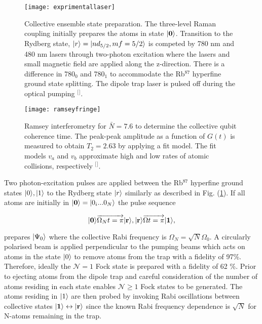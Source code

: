 \begin{figure}[t]
\centering
\texttt{[image: exprimentallaser]}
\caption{\label{fig:experimentallaser} Collective ensemble state preparation. The three-level Raman coupling initially prepares the atoms in state $\lvert\textbf{0}\rangle$. Transition to the Rydberg state, $\lvert r\rangle=\lvert nd_{5/2},mf=5/2\rangle$ is competed by 780 nm and 480 nm lasers through two-photon excitation where the lasers and small magnetic field are applied along the z-direction. There is a difference in 780$_{0}$ and 780$_{1}$ to accommodate the Rb$^{87}$ hyperfine ground state splitting. The dipole trap laser is pulsed off during the optical pumping $^{[}$\citep{Ebert2015CoherenceQubits}$^{]}$.}
\end{figure}

\begin{figure}[b]
\centering
\texttt{[image: ramseyfringe]}
\caption{\label{fig:ramseyfringe} Ramsey interferometry for $\bar{N}=7.6$ to determine the collective qubit coherence time. The peak-peak amplitude as a function of $G(t)$ is measured to obtain $T_{2}=2.63$ by applying a fit model. The fit models $v_{a}$ and $v_{b}$ approximate high and low rates of atomic collisions, respectively $^{[}$\citep{Ebert2015CoherenceQubits}$^{]}$.}
\end{figure}

Two photon-excitation pulses are applied between the Rb$^{87}$ hyperfine ground states $\lvert0\rangle,\lvert1\rangle$ to the Rydberg state $\lvert r\rangle$ similarly as described in Fig. (\ref{fig:experimentallaser}). If all atoms are initially in $\lvert\textbf{0}\rangle=\lvert0_{i}...0_{N}\rangle$ the pulse sequence

\begin{equation}
\label{eq:pulsesequence1}
\lvert\textbf{0}\rangle \overrightarrow{\Omega_{N}t=\pi} \lvert\textbf{r}\rangle, \lvert\textbf{r}\rangle \overrightarrow{\Omega t=\pi} \lvert\textbf{1}\rangle,
\end{equation}

\noindent prepares $\lvert\Psi_{0}\rangle$ where the collective Rabi frequency is $\Omega_{N}=\sqrt{N}\Omega_{0}$. A circularly polarised beam is applied perpendicular to the pumping beams which acts on atoms in the state $\lvert0\rangle$ to remove atoms from the trap with a fidelity of 97\%. Therefore, ideally the $\mathcal{N}=1$ Fock state is prepared with a fidelity of 62 \%. Prior to ejecting atoms from the dipole trap and careful consideration of the number of atoms residing in each state enables $\mathcal{N} \geq 1$ Fock states to be generated. The atoms residing in $\lvert1\rangle$ are then probed by invoking Rabi oscillations between collective states $\lvert\textbf{1}\rangle \leftrightarrow \lvert\textbf{r}\rangle$ since the known Rabi frequency dependence is $\sqrt{N}$ for N-atoms remaining in the trap. 

